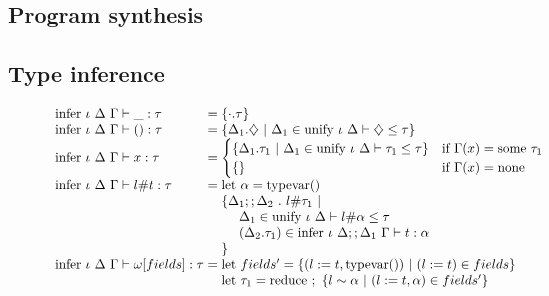 \documentclass[sigplan,screen]{acmart}
\begin{document}
\subsection{Program synthesis}
\subsection{Type inference}

\begin{figure*}[h]
  \[
    \begin{array}{l @{} l}
      \text{infer } \iota\ \Delta\ \Gamma \vdash 
      \_ : \tau
      &{} =
      \{\cdot.\tau\}
      \\

      \text{infer } \iota\ \Delta\ \Gamma \vdash 
      () : \tau
      &{} =
      \begin{array}[t]{@{} l}
        \{\Delta_1.\diamondsuit\ |
        \ \Delta_1 \in \text{unify } \iota\ \Delta \vdash \diamondsuit \leq \tau
        \}
      \end{array}
      \\

      \text{infer } \iota\ \Delta\ \Gamma \vdash 
      x : \tau
      &{} =
      \begin{cases}  
        \{\Delta_1.\tau_1\ |
        \ \Delta_1 \in \text{unify } \iota\ \Delta \vdash \tau_1 \leq \tau
        \}
        &\text{if } \Gamma(x) = \text{some } \tau_1
        \\
        \{\}
        &\text{if } \Gamma(x) = \text{none}
      \end{cases}
      \\

      \text{infer } \iota\ \Delta\ \Gamma \vdash 
      l \# t : \tau
      &{} =
      \begin{array}[t]{@{} l}
        \text{let } \alpha = \text{typevar}() 
        \\
        \{\Delta_1;;\Delta_2\ .\ l \# \tau_1 \ |
        \\
        \ \ \ \ \Delta_1 \in \text{unify } \iota\ \Delta \vdash l \# \alpha \leq \tau
        \\
        \ \ \ \ (\Delta_2.\tau_1) \in \text{infer } \iota\ \Delta;;\Delta_1\ \Gamma \vdash t : \alpha
        \\
        \}
      \end{array}
      \\

      \text{infer } \iota\ \Delta\ \Gamma \vdash 
      \omega[ fields ] : \tau
      &{} =
      \begin{array}[t]{@{} l}
        \text{let } fields' = \{(l:=t, \text{typevar}())\ |\ (l:=t) \in fields \}
        \\
        \text{let } \tau_1 = \text{reduce } ;\ \{l \sim \alpha\ |\ (l := t, \alpha) \in fields' \}
        \\



\end{array}
\end{array}\]
\end{figure*}
\end{document}

